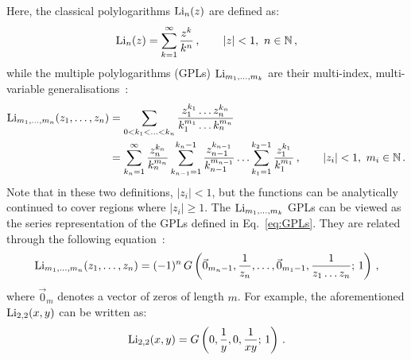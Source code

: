 \documentclass[main.tex]{subfiles}
\begin{document}
Here, the classical polylogarithms $\text{Li}_n(z)$ are defined as:
\begin{equation} \label{eq:Lidefinition}
    \text{Li}_n(z) = \sum_{k=1}^\infty \frac{z^k}{k^n}\,, \qquad |z|<1,\,\, n \in \mathbb{N}\,,
\end{equation}
while the multiple polylogarithms (GPLs) $\text{Li}_{m_1, \ldots, m_k}$ are their multi-index, multi-variable generalisations~\cite{2011arXiv1105.2076G, Duhr:2019tlz}:
\begin{subequations}
\begin{align} \label{eq:multiLidefinition}
    \text{Li}_{m_1, \ldots, m_n}(z_1, \ldots, z_n) &= \sum_{0<k_1<\ldots<k_n} \frac{z_1^{k_1} \ldots z_n^{k_n}}{k_1^{m_1} \ldots k_n^{m_n}} \\
    &= \sum_{k_n=1}^\infty \frac{z_n^{k_n}}{k_n^{m_n}} \sum_{k_{n-1}=1}^{k_n-1} \frac{z_{n-1}^{k_{n-1}}}{k_{n-1}^{m_{n-1}}}\ldots \sum_{k_1=1}^{k_2-1} \frac{z_1^{k_1}}{k_1^{m_1}}\,, \qquad |z_i|<1, \,\, m_i \in \mathbb{N} \,. \label{eq:multiLidefinition2}
\end{align}
\end{subequations}
Note that in these two definitions, $|z_i|<1$, but the functions can be analytically continued to cover regions where $|z_i| \ge 1$. The $\text{Li}_{m_1, \ldots, m_k}$ GPLs can be viewed as the series representation of the GPLs defined in Eq.~\ref{eq:GPLs}. They are related through the following equation~\cite{Duhr:2011zq}:
\begin{equation} \label{eq:LiToG}
    \text{Li}_{m_1, \ldots, m_n}(z_1, \ldots, z_n) = (-1)^n\,G\left(\vec{0}_{m_n-1}, \frac{1}{z_n}, \ldots, \vec{0}_{m_1-1}, \frac{1}{z_1\ldots z_n}; \,1 \right)\,,
\end{equation}
where $\vec{0}_m$ denotes a vector of zeros of length $m$. For example, the aforementioned $\text{Li}_{2,2}(x, y)$ can be written as:%
\begin{equation}
     \text{Li}_{2,2}(x, y) = G\left(0, \frac{1}{y}, 0, \frac{1}{xy};\,1 \right)\,.
\end{equation}
\end{document}
